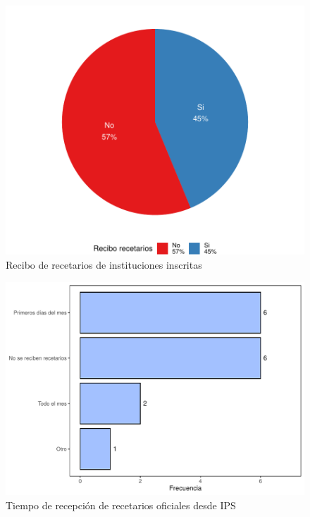 \documentclass[
]{book}
\begin{document}
\begin{figure}
\includegraphics[width=0.85\linewidth]{InformeFinal_files/figure-latex/ReciboRecetariosInstituciones-1} \caption{Recibo de recetarios de instituciones inscritas}\label{fig:ReciboRecetariosInstituciones}
\end{figure}

\begin{figure}
\includegraphics[width=0.85\linewidth]{InformeFinal_files/figure-latex/TiempoRecepcionRecOficiales-1} \caption{Tiempo de recepción de recetarios oficiales desde IPS}\label{fig:TiempoRecepcionRecOficiales}
\end{figure}
\end{document}
